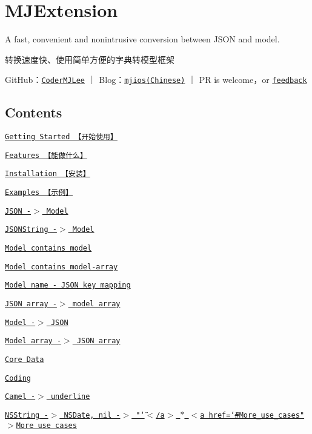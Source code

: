  \section*{M\+J\+Extension }


\begin{DoxyItemize}
\item A fast, convenient and nonintrusive conversion between J\+S\+ON and model.
\item 转换速度快、使用简单方便的字典转模型框架
\end{DoxyItemize}

Git\+Hub：\href{https://github.com/CoderMJLee}{\tt Coder\+M\+J\+Lee} ｜ Blog：\href{http://www.cnblogs.com/mjios}{\tt mjios(\+Chinese)} ｜ PR is welcome，or \href{mailto:richermj123go@vip.qq.com}{\tt feedback}

\subsection*{Contents}


\begin{DoxyItemize}
\item \href{#Getting_Started}{\tt Getting Started 【开始使用】}
\begin{DoxyItemize}
\item \href{#Features}{\tt Features 【能做什么】}
\item \href{#Installation}{\tt Installation 【安装】}
\end{DoxyItemize}
\item \href{#Examples}{\tt Examples 【示例】}
\begin{DoxyItemize}
\item \href{#JSON_Model}{\tt J\+S\+ON -\/$>$ Model}
\item \href{#JSONString_Model}{\tt J\+S\+O\+N\+String -\/$>$ Model}
\item \href{#Model_contains_model}{\tt Model contains model}
\item \href{#Model_contains_model_array}{\tt Model contains model-\/array}
\item \href{#Model_name_JSON_key_mapping}{\tt Model name -\/ J\+S\+ON key mapping}
\item \href{#JSON_array_model_array}{\tt J\+S\+ON array -\/$>$ model array}
\item \href{#Model_JSON}{\tt Model -\/$>$ J\+S\+ON}
\item \href{#Model_array_JSON_array}{\tt Model array -\/$>$ J\+S\+ON array}
\item \href{#Core_Data}{\tt Core Data}
\item \href{#Coding}{\tt Coding}
\item \href{#Camel_underline}{\tt Camel -\/$>$ underline}
\item \href{#NSString_NSDate}{\tt N\+S\+String -\/$>$ N\+S\+Date, nil -\/$>$ "\char`\"{}$<$/a$>$
    $\ast$ $<$a href=\char`\"{}\#\+More\+\_\+use\+\_\+cases"$>$More use cases} 


\end{DoxyItemize}
\end{DoxyItemize}

